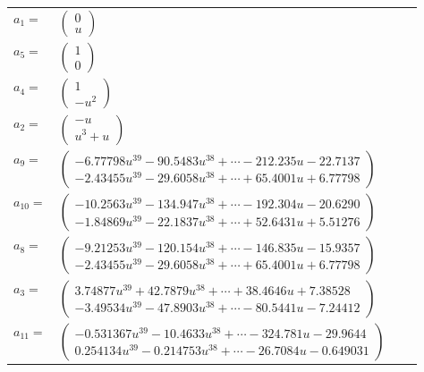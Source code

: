 \documentclass[1p]{elsarticle_modified}
\theoremstyle{definition}
\begin{document}
\begin{tabular}{m{7pt} m{180pt} m{7pt} m{180pt} }
\flushright $a_{1}=$&$\begin{pmatrix}0\\u\end{pmatrix}$ \\
\flushright $a_{5}=$&$\begin{pmatrix}1\\0\end{pmatrix}$ \\
\flushright $a_{4}=$&$\begin{pmatrix}1\\- u^2\end{pmatrix}$ \\
\flushright $a_{2}=$&$\begin{pmatrix}- u\\u^3+u\end{pmatrix}$ \\
\flushright $a_{9}=$&$\begin{pmatrix}-6.77798 u^{39}-90.5483 u^{38}+\cdots-212.235 u-22.7137\\-2.43455 u^{39}-29.6058 u^{38}+\cdots+65.4001 u+6.77798\end{pmatrix}$ \\
\flushright $a_{10}=$&$\begin{pmatrix}-10.2563 u^{39}-134.947 u^{38}+\cdots-192.304 u-20.6290\\-1.84869 u^{39}-22.1837 u^{38}+\cdots+52.6431 u+5.51276\end{pmatrix}$ \\
\flushright $a_{8}=$&$\begin{pmatrix}-9.21253 u^{39}-120.154 u^{38}+\cdots-146.835 u-15.9357\\-2.43455 u^{39}-29.6058 u^{38}+\cdots+65.4001 u+6.77798\end{pmatrix}$ \\
\flushright $a_{3}=$&$\begin{pmatrix}3.74877 u^{39}+42.7879 u^{38}+\cdots+38.4646 u+7.38528\\-3.49534 u^{39}-47.8903 u^{38}+\cdots-80.5441 u-7.24412\end{pmatrix}$ \\
\flushright $a_{11}=$&$\begin{pmatrix}-0.531367 u^{39}-10.4633 u^{38}+\cdots-324.781 u-29.9644\\0.254134 u^{39}-0.214753 u^{38}+\cdots-26.7084 u-0.649031\end{pmatrix}$ \\

\end{tabular}
\end{document}
